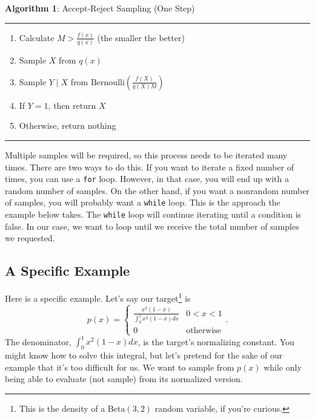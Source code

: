 \documentclass[
  12pt,
]{krantz}
\providecommand{\tightlist}{%
  \setlength{\itemsep}{0pt}\setlength{\parskip}{0pt}}
\begin{document}
\textbf{Algorithm 1}: Accept-Reject Sampling (One Step)

\begin{center}\rule{0.5\linewidth}{0.5pt}\end{center}

\begin{enumerate}
\def\labelenumi{\arabic{enumi}.}
\tightlist
\item
  Calculate \(M > \frac{f(x)}{q(x)}\) (the smaller the better)
\item
  Sample \(X\) from \(q(x)\)
\item
  Sample \(Y \mid X\) from \(\text{Bernoulli}\left(\frac{f(X)}{q(X)M}\right)\)
\item
  If \(Y = 1\), then return \(X\)
\item
  Otherwise, return nothing
\end{enumerate}

\begin{center}\rule{0.5\linewidth}{0.5pt}\end{center}

Multiple samples will be required, so this process needs to be iterated many times. There are two ways to do this. If you want to iterate a fixed number of times, you can use a \texttt{for} loop. However, in that case, you will end up with a random number of samples. On the other hand, if you want a nonrandom number of samples, you will probably want a \texttt{while} loop. This is the approach the example below takes. The \texttt{while} loop will continue iterating until a condition is false. In our case, we want to loop until we receive the total number of samples we requested.

\hypertarget{a-specific-example}{%
\subsection{A Specific Example}\label{a-specific-example}}

Here is a specific example. Let's say our target\footnote{This is the density of a \(\text{Beta}(3,2)\) random variable, if you're curious.} is
\[
p(x) = 
\begin{cases}
\frac{x^2(1-x)}{\int_0^1 x^2(1-x) dx} & 0 < x < 1 \\
0 & \text{otherwise}
\end{cases}.
\]
The denominator, \(\int_0^1 x^2(1-x) dx\), is the target's normalizing constant. You might know how to solve this integral, but let's pretend for the sake of our example that it's too difficult for us. We want to sample from \(p(x)\) while only being able to evaluate (not sample) from its normalized version.
\end{document}
